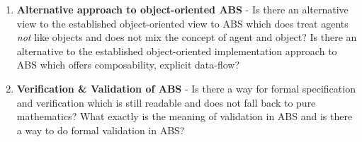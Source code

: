\begin{enumerate}
	\item \textbf{Alternative approach to object-oriented ABS} - Is there an alternative view to the established object-oriented view to ABS which does treat agents \textit{not} like objects and does not mix the concept of agent and object? Is there an alternative to the established object-oriented implementation approach to ABS which offers composability, explicit data-flow?
	\item \textbf{Verification \& Validation of ABS} - Is there a way for formal specification and verification which is still readable and does not fall back to pure mathematics? What exactly is the meaning of validation in ABS and is there a way to do formal validation in ABS? 
\end{enumerate}